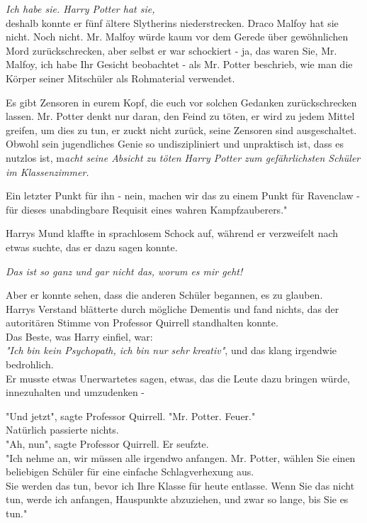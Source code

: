 {\emph{Ich habe sie. Harry Potter hat sie,}\\ deshalb konnte er fünf ältere Slytherins niederstrecken. Draco Malfoy hat sie nicht. Noch nicht. Mr. Malfoy würde kaum vor dem Gerede über gewöhnlichen Mord zurückschrecken, aber selbst er war schockiert - ja, das waren Sie, Mr. Malfoy, ich habe Ihr Gesicht beobachtet - als Mr. Potter beschrieb, wie man die Körper seiner Mitschüler als Rohmaterial verwendet.

Es gibt Zensoren in eurem Kopf, die euch vor solchen Gedanken zurückschrecken lassen. Mr. Potter denkt nur daran, den Feind zu töten, er wird zu jedem Mittel greifen, um dies zu tun, er zuckt nicht zurück, seine Zensoren sind ausgeschaltet.\\ Obwohl sein jugendliches Genie so undiszipliniert und unpraktisch ist, dass es nutzlos ist, m\emph{acht seine Absicht zu töten Harry Potter zum gefährlichsten Schüler im Klassenzimmer.}

Ein letzter Punkt für ihn - nein, machen wir das zu einem Punkt für Ravenclaw - für dieses unabdingbare Requisit eines wahren Kampfzauberers."

Harrys Mund klaffte in sprachlosem Schock auf, während er verzweifelt nach etwas suchte, das er dazu sagen konnte.

\emph{Das ist so ganz und gar nicht das, worum es mir geht!}

Aber er konnte sehen, dass die anderen Schüler begannen, es zu glauben.\\ Harrys Verstand blätterte durch mögliche Dementis und fand nichts, das der autoritären Stimme von Professor Quirrell standhalten konnte.\\ Das Beste, was Harry einfiel, war:\\ \emph{"Ich bin kein Psychopath, ich bin nur sehr kreativ"}, und das klang irgendwie bedrohlich.\\ Er musste etwas Unerwartetes sagen, etwas, das die Leute dazu bringen würde, innezuhalten und umzudenken -

"Und jetzt", sagte Professor Quirrell. "Mr. Potter. Feuer."\\ Natürlich passierte nichts.\\ "Ah, nun", sagte Professor Quirrell. Er seufzte.\\ "Ich nehme an, wir müssen alle irgendwo anfangen. Mr. Potter, wählen Sie einen beliebigen Schüler für eine einfache Schlagverhexung aus.\\ Sie werden das tun, bevor ich Ihre Klasse für heute entlasse. Wenn Sie das nicht tun, werde ich anfangen, Hauspunkte abzuziehen, und zwar so lange, bis Sie es tun."

}
